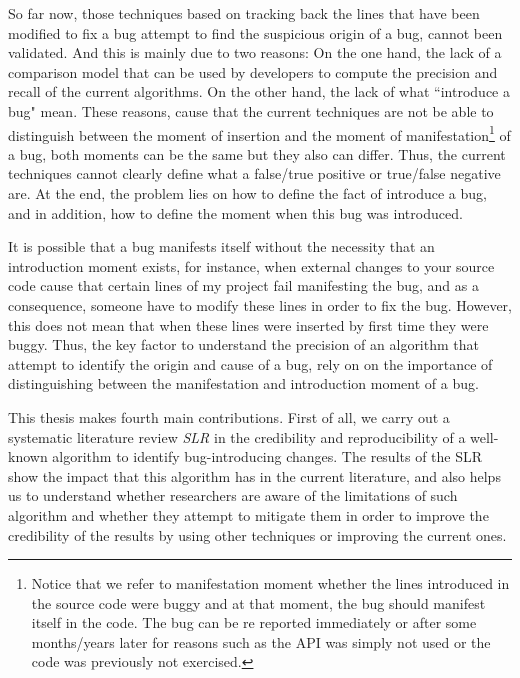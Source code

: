 \documentclass[a4paper, 12pt]{book}
\begin{document}
So far now, those techniques based on tracking back the lines that have been modified to fix a bug attempt to find the suspicious origin of a bug, cannot been validated. And this is mainly due to two reasons: On the one hand, the lack of a comparison model that can be used by developers to compute the precision and recall of the current algorithms. On the other hand, the lack of what ``introduce a bug" mean. These reasons, cause that the current techniques are not be able to distinguish between the moment of insertion and the moment of manifestation\footnote{Notice that we refer to manifestation moment whether the lines introduced in the source code were buggy and at that moment, the bug should manifest itself in the code. The bug can be re reported immediately or after some months/years later for reasons such as the API was simply not used or the code was previously not exercised.} of a bug, both moments can be the same but they also can differ. Thus, the current techniques cannot clearly define what a false/true positive or true/false negative are. At the end, the problem lies on how to define the fact of introduce a bug, and in addition, how to define the moment when this bug was introduced.

It is possible that a bug manifests itself without the necessity that an introduction moment exists, for instance, when external changes to your source code cause that certain lines of my project fail manifesting the bug, and as a consequence, someone have to modify these lines in order to fix the bug. However, this does not mean that when these lines were inserted by first time they were buggy. Thus, the key factor to understand the precision of an algorithm that attempt to identify the origin and cause of a bug, rely on on the importance of distinguishing between the manifestation and introduction moment of a bug.

This thesis makes fourth main contributions. First of all, we carry out a systematic literature review \emph{SLR} in the credibility and reproducibility of a well-known algorithm to identify bug-introducing changes. The results of the SLR show the impact that this algorithm has in the current literature, and also helps us to understand whether researchers are aware of the limitations of such algorithm and whether they attempt to mitigate them in order to improve the credibility of the results by using other techniques or improving the current ones. 
\end{document}

